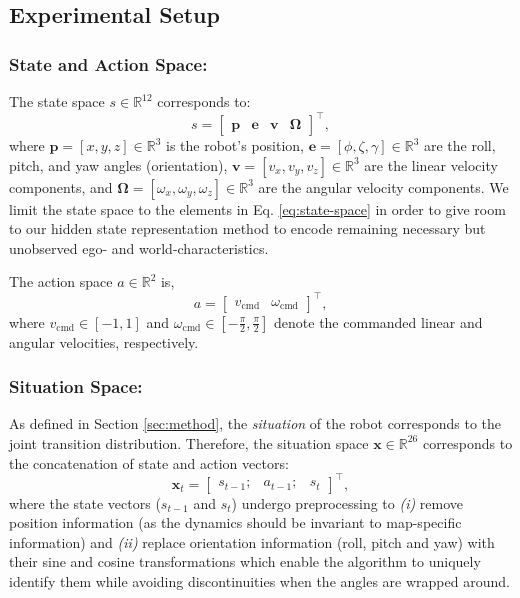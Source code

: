 \documentclass[Afour,sageh,times]{sagej}
\theoremstyle{lemma}
\begin{document}
\subsection{Experimental Setup} \label{sec:exp-setup-ugv}

\subsubsection{State and Action Space:} The state space $s \in \mathbb{R}^{12}$ corresponds to: 
\begin{equation} \label{eq:state-space}
s = \begin{bmatrix} \mathbf{p} & \mathbf{e} & \mathbf{v} & \mathbf{\Omega} \end{bmatrix}^\top,
\end{equation}
where $\mathbf{p} = [x, y, z]\in \mathbb{R}^3$ is the robot's position, 
$\mathbf{e} = [\phi, \zeta, \gamma] \in \mathbb{R}^3$ are the roll, pitch, and yaw angles (orientation), $\mathbf{v} = [v_x, v_y, v_z] \in \mathbb{R}^3$ are the linear velocity components, and $\mathbf{\Omega} = [\omega_x, \omega_y, \omega_z] \in \mathbb{R}^3$ are the angular velocity components.
We limit the state space to the elements in Eq. \eqref{eq:state-space} in order to give room to our hidden state representation method to encode remaining necessary but unobserved ego- and world-characteristics.

The action space $a \in \mathbb{R}^2$ is,
\begin{equation} \label{eq:action-space}
    a = \begin{bmatrix}
    v_{\text{cmd}} & \omega_{\text{cmd}}
    \end{bmatrix}^\top,
\end{equation}
where $v_{\text{cmd}} \in [-1, 1]$ and $\omega_{\text{cmd}} \in [-\frac{\pi}{2}, \frac{\pi}{2}]$ denote the commanded linear and angular velocities, respectively.

\subsubsection{Situation Space:} As defined in Section \ref{sec:method}, the \textit{situation} of the robot corresponds to the joint transition distribution. Therefore, the situation space $\mathbf{x} \in \mathbb{R}^{26}$ corresponds to the concatenation of state and action vectors:
\begin{equation} \label{eq:situation-space-ugv}
    \mathbf{x}_t = \begin{bmatrix} s_{t-1}; & a_{t-1}; & s_t \end{bmatrix}^\top,
\end{equation}
where the state vectors ($s_{t-1}$ and $s_t$) undergo preprocessing to \textit{(i)} remove position information (as the dynamics should be invariant to map-specific information) and \textit{(ii)} replace orientation information (roll, pitch and yaw) with their sine and cosine transformations which enable the algorithm to uniquely identify them while avoiding discontinuities when the angles are wrapped around. 
\end{document}
